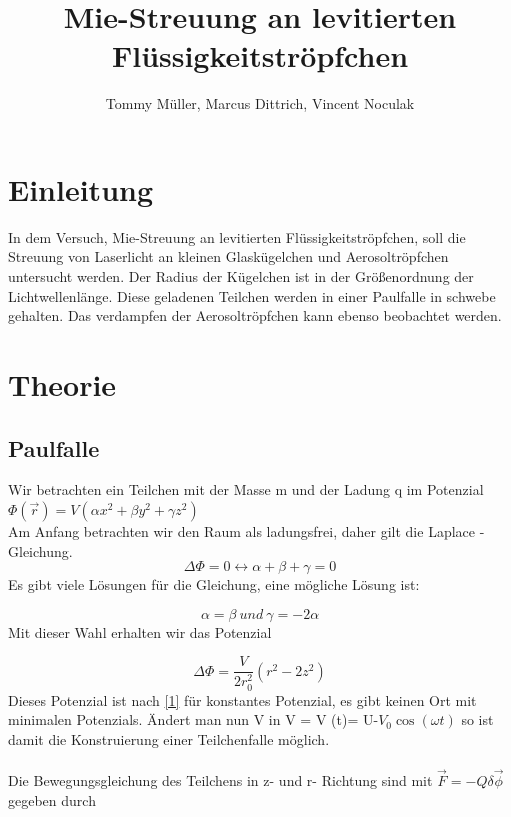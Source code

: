 \documentclass[10pt,a4paper]{article}
\author{Tommy Müller, Marcus Dittrich, Vincent Noculak}
\title{ Mie-Streuung an levitierten Flüssigkeitströpfchen}
\begin{document}
\maketitle
\newpage
\tableofcontents
\newpage

\section{Einleitung}

In dem Versuch, Mie-Streuung an levitierten Flüssigkeitströpfchen, soll die Streuung von Laserlicht an kleinen Glaskügelchen und Aerosoltröpfchen untersucht werden. Der Radius der Kügelchen ist in der Größenordnung der Lichtwellenlänge. Diese geladenen Teilchen werden in einer Paulfalle in schwebe gehalten. Das verdampfen der Aerosoltröpfchen kann ebenso beobachtet werden.

\section{Theorie}
\subsection{Paulfalle}

Wir betrachten ein Teilchen mit der Masse m und der Ladung q im Potenzial\\

$\Phi(\overrightarrow r) = V (\alpha x^2+\beta y^2+\gamma z^2)$\\
Am Anfang betrachten wir den Raum als ladungsfrei, daher gilt die Laplace - Gleichung.\\
\begin{equation}
\Delta \Phi = 0   \leftrightarrow \alpha + \beta + \gamma = 0
\label {1}
\end{equation}
Es gibt viele Lösungen für die Gleichung, eine mögliche Lösung ist:

$$\alpha = \beta\ und\ \gamma = -2 \alpha$$
Mit dieser Wahl erhalten wir das Potenzial

\begin{equation}
\Delta \Phi = \frac{V}{2r_0^2}(r^2-2z^2)
\label {2}
\end{equation}
Dieses Potenzial ist nach \ref {1} für konstantes Potenzial, es gibt keinen Ort mit minimalen Potenzials. Ändert man nun V in V = V (t)= U-$V_0 \cos(\omega t)$ so ist damit die Konstruierung einer Teilchenfalle möglich. \\ \\Die Bewegungsgleichung des Teilchens in z- und r- Richtung sind mit $\overrightarrow F = - Q \delta\overrightarrow \phi$ gegeben durch
\end{document}
